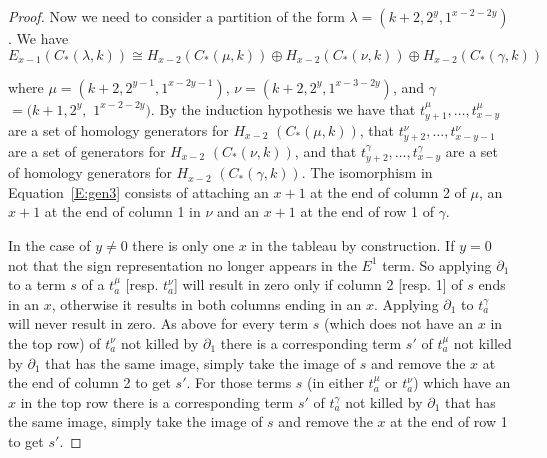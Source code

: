 \documentclass{amsart}
\begin{document}
\begin{proof}
  Now we need to consider a partition of the form $\lambda = (k+2, 2^y, 1^{x-2-2y})$. We have 
  \begin{equation} \label{E:gen3} 
    E_{x-1}(C_*(\lambda,k)) \cong H_{x-2}(C_*(\mu,k)) \oplus H_{x-2}(C_*(\nu,k)) \oplus H_{x-2}(C_*(\gamma,k))
  \end{equation}
 
  where $\mu = (k+2, 2^{y-1}, 1^{x-2y-1})$, $\nu = (k+2, 2^y, 1^{x-3-2y})$, and $\gamma$ $= (k+1, 2^y,$ $1^{x-2-2y})$. By the induction 
  hypothesis we have that $t^{\mu}_{y+1}, \ldots, t^\mu_{x-y}$ are a set of homology generators for $H_{x-2}$ $(C_*(\mu,k))$, that 
  $t^{\nu}_{y+2}, \ldots, t^\nu_{x-y-1}$ are a set of generators for $H_{x-2}$ $(C_*(\nu,k))$, and that $t^\gamma_{y+2}, \ldots, t^{\gamma}_{x-y}$ are
  a set of homology generators for $H_{x-2}$ $(C_*(\gamma,k))$. The isomorphism in
  Equation~\ref{E:gen3} consists of attaching an $x+1$ at the end of column 2 of $\mu$, an $x+1$ at the end of column 1 in $\nu$ and an
  $x+1$ at the end of row 1 of $\gamma$. 

  In the case of $y \ne 0$ there is only one 
  $x$ in the tableau by construction. If $y=0$ not that the sign representation no longer appears in the $E^1$ term.
  So applying $\partial_1$ to a term $s$ of a $t^\mu_a$ [resp. $t^\nu_a$] will result in zero only if 
  column 2 [resp. 1] of $s$ ends in an $x$, otherwise it results in both columns ending in an $x$. Applying $\partial_1$ to $t^\gamma_a$ 
  will never result in zero. As above for every term $s$ (which does not have an $x$ in the top row) of $t^\nu_a$ not killed by 
  $\partial_1$ there is a corresponding term 
  $s'$ of $t^\mu_a$ not killed by $\partial_1$ that has the same image, simply take the image of $s$ and remove the $x$ at the end of 
  column 2 to get $s'$. For those terms $s$ (in either $t^\mu_a$ or $t^\nu_a$) which have an $x$ in the top row there is a corresponding
  term $s'$ of $t^\gamma_a$ not killed by $\partial_1$ that
  has the same image, simply take the image of $s$ and remove the $x$ at the end of row 1 to get $s'$. 


\end{proof}
\end{document}
